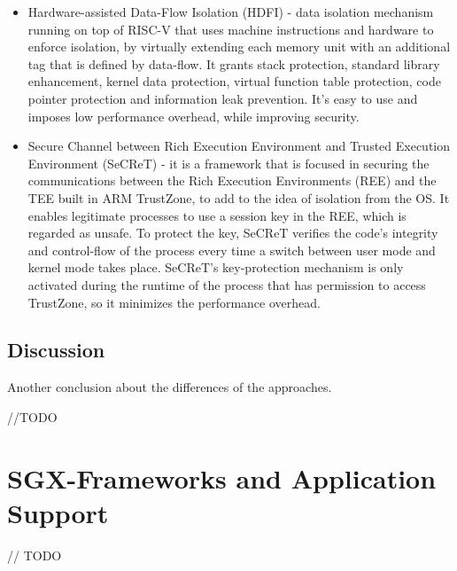 \begin{itemize}
	\item Hardware-assisted Data-Flow Isolation (HDFI) \cite{hdmiPaper} - data isolation mechanism running on top of RISC-V that uses machine instructions and hardware to enforce isolation, by virtually extending each memory unit with an additional tag that is defined by data-flow. It grants stack protection, standard library enhancement, kernel data protection, virtual function table protection, code pointer protection and information leak prevention. It's easy to use and imposes low performance overhead, while improving security.
	
	\item Secure Channel between Rich Execution Environment and Trusted Execution Environment (SeCReT) \cite{secretPaper} - it is a framework that is focused in securing the communications between the Rich Execution Environments (REE) and the TEE built in ARM TrustZone, to add to the idea of isolation from the OS. It enables legitimate processes to use a session key in the REE, which is regarded as unsafe. To protect the key, SeCReT verifies the code's integrity and control-flow of the process every time a switch between user mode and kernel mode takes place. SeCReT's key-protection mechanism is only activated during the runtime of the process that has permission to access TrustZone, so it minimizes the performance overhead.
	
\end{itemize}



\subsection{Discussion}

Another conclusion about the differences of the approaches. 
 
//TODO








\section{SGX-Frameworks and Application Support} %
\label{sec:package_options}

// TODO 

